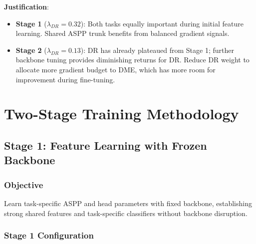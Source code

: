 \documentclass[12pt,a4paper]{article}
\begin{document}
\textbf{Justification}:
\begin{itemize}
    \item \textbf{Stage 1} ($\lambda_{DR} = 0.32$): Both tasks equally important during initial feature learning. Shared ASPP trunk benefits from balanced gradient signals.
    
    \item \textbf{Stage 2} ($\lambda_{DR} = 0.13$): DR has already plateaued from Stage 1; further backbone tuning provides diminishing returns for DR. Reduce DR weight to allocate more gradient budget to DME, which has more room for improvement during fine-tuning.
\end{itemize}

\newpage

\section{Two-Stage Training Methodology}

\subsection{Stage 1: Feature Learning with Frozen Backbone}

\subsubsection{Objective}

Learn task-specific ASPP and head parameters with fixed backbone, establishing strong shared features and task-specific classifiers without backbone disruption.

\subsubsection{Stage 1 Configuration}
\end{document}

